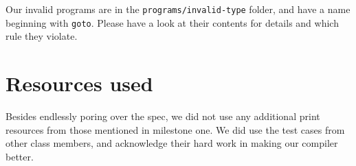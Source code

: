\documentclass[letterpaper,11pt]{article}
\begin{document}
Our invalid programs are in the \texttt{programs/invalid-type} folder, and have a name beginning with \texttt{goto}. Please have a look at their contents for details and which rule they violate.

\section{Resources used}
Besides endlessly poring over the spec, we did not use any additional print resources from those mentioned in milestone one. We did use the test cases from other class members, and acknowledge their hard work in making our compiler better.
\end{document}
